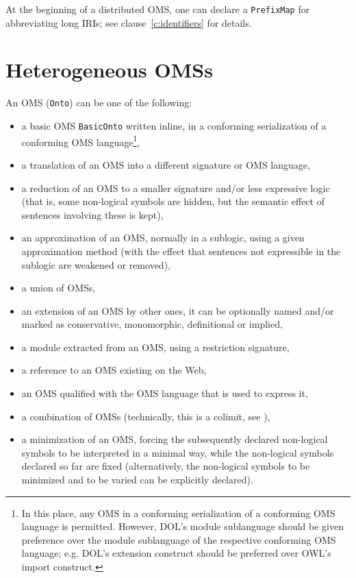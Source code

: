 \documentclass[10pt,%
\ifpretendfinal
final%
\else
draft%
\fi,
]{scrreprt}
\makeatletter
\newcommand*{\eg}{e.g.\@\xspace}
\newcommand*{\syntax}[1]{\texttt{#1}}
\newcommand{\clauserefname}{clause}
\newcommand{\cref}[1]{\clauserefname~\ref{#1}}
\newcommand{\sclause}[1]{\section{#1}}
\makeatother
\begin{document}
At the beginning of a distributed OMS, one can declare a \syntax{PrefixMap} for abbreviating long IRIs; see \cref{c:identifiers} for details.

\sclause{Heterogeneous OMSs}

An OMS (\syntax{Onto}) can be one of the following:
\begin{itemize}
\item a basic OMS \syntax{BasicOnto} written inline, in a conforming serialization of a conforming OMS language\footnote{In this place, any OMS in a conforming serialization of a conforming OMS language is permitted.  However, DOL's module sublanguage should be given preference over the module sublanguage of the respective conforming OMS language; \eg DOL's extension construct should be preferred over OWL's import construct.},
\item a translation of an OMS into a different signature or OMS
language,
\item a reduction of an OMS to a smaller signature and/or less
expressive logic (that is,
some non-logical symbols are hidden, but the semantic effect of sentences involving these is kept),
\item an approximation of an OMS, normally in a sublogic, using a given approximation method (with the effect that sentences not expressible in the sublogic are weakened or removed),
\item a union of OMSs,
\item an extension of an OMS by other ones, it can be optionally named and/or marked as conservative, monomorphic, definitional or implied,
\item a module extracted from an OMS, using a restriction signature,
\item a reference to an OMS existing on the Web,
\item an OMS qualified with the OMS language that is used to express it,
\item a combination of OMSs (technically, this is a colimit, see \cite{ZimmermanEtAl06}),
\item a minimization of an OMS, forcing the subsequently declared
  non-logical symbols to be interpreted in a minimal way, while the non-logical symbols declared so far are fixed (alternatively, the non-logical symbols to be minimized and to be varied can be explicitly declared).
\end{itemize}
\end{document}
